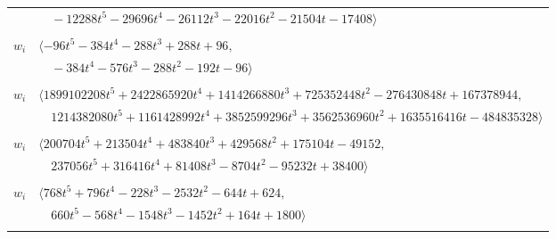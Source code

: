 \documentclass[11pt]{article}
\begin{document}
\begin{longtable}{@{}ll@{}}
 & $\quad -12288t^{5}-29696t^{4}-26112t^{3}-22016t^{2}-21504t-17408\rangle$\\
\addlinespace[2pt]
\multicolumn{2}{@{}p{0.97\textwidth}@{}}{$i=42$, $D_i=32$, $\rho_{ij}$: $5{:}2, \allowbreak 11{:}2, \allowbreak 15{:}2, \allowbreak 19{:}1, \allowbreak 35{:}2, \allowbreak 47{:}1$}\\
$w_i$ & $\langle -96t^{5}-384t^{4}-288t^{3}+288t+96,$\\
 & $\quad -384t^{4}-576t^{3}-288t^{2}-192t-96\rangle$\\
\addlinespace[2pt]
\multicolumn{2}{@{}p{0.97\textwidth}@{}}{$i=43$, $D_i=131072$, $\rho_{ij}$: $1{:}1, \allowbreak 2{:}2, \allowbreak 4{:}2, \allowbreak 14{:}2, \allowbreak 20{:}2, \allowbreak 21{:}2, \allowbreak 23{:}1, \allowbreak 26{:}2, \allowbreak 29{:}1, \allowbreak 37{:}2, \allowbreak 49{:}2, \allowbreak 56{:}2, \allowbreak 63{:}2, \allowbreak 65{:}2, \allowbreak 68{:}1$}\\
$w_i$ & $\langle 1899102208t^{5}+2422865920t^{4}+1414266880t^{3}+725352448t^{2}-276430848t+167378944,$\\
 & $\quad 1214382080t^{5}+1161428992t^{4}+3852599296t^{3}+3562536960t^{2}+1635516416t-484835328\rangle$\\
\addlinespace[2pt]
\multicolumn{2}{@{}p{0.97\textwidth}@{}}{$i=44$, $D_i=512$, $\rho_{ij}$: $4{:}2, \allowbreak 9{:}1, \allowbreak 11{:}1, \allowbreak 13{:}1, \allowbreak 14{:}2, \allowbreak 20{:}2, \allowbreak 24{:}1, \allowbreak 49{:}2, \allowbreak 50{:}2, \allowbreak 51{:}1, \allowbreak 54{:}1, \allowbreak 67{:}1, \allowbreak 68{:}1$}\\
$w_i$ & $\langle 200704t^{5}+213504t^{4}+483840t^{3}+429568t^{2}+175104t-49152,$\\
 & $\quad 237056t^{5}+316416t^{4}+81408t^{3}-8704t^{2}-95232t+38400\rangle$\\
\addlinespace[2pt]
\multicolumn{2}{@{}p{0.97\textwidth}@{}}{$i=45$, $D_i=4$, $\rho_{ij}$: $2{:}1, \allowbreak 3{:}2, \allowbreak 8{:}2, \allowbreak 14{:}2, \allowbreak 25{:}2, \allowbreak 30{:}1, \allowbreak 33{:}2, \allowbreak 49{:}1, \allowbreak 52{:}1, \allowbreak 54{:}2, \allowbreak 57{:}2, \allowbreak 58{:}2, \allowbreak 63{:}1$}\\
$w_i$ & $\langle 768t^{5}+796t^{4}-228t^{3}-2532t^{2}-644t+624,$\\
 & $\quad 660t^{5}-568t^{4}-1548t^{3}-1452t^{2}+164t+1800\rangle$\\
\addlinespace[2pt]
\multicolumn{2}{@{}p{0.97\textwidth}@{}}{$i=46$, $D_i=4$, $\rho_{ij}$: $2{:}2, \allowbreak 6{:}2, \allowbreak 11{:}2, \allowbreak 12{:}1, \allowbreak 19{:}2, \allowbreak 21{:}1, \allowbreak 37{:}2, \allowbreak 54{:}2, \allowbreak 57{:}2, \allowbreak 66{:}1, \allowbreak 67{:}1$}\\

\end{longtable}
\end{document}

